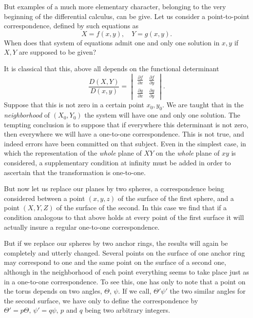 \documentclass[12pt,oneside]{book}
\begin{document}
But examples of a much more elementary character, belonging to the very
beginning of the differential calculus, can be give. Let us consider a
point-to-point correspondence, defined by such equations as
$$X=f(x,y),\quad Y=g(x,y).$$
When does that system of equations admit one and only one solution in $x,y$ if
$X, Y$ are supposed to be given? \par

It is classical that this, above all depends on the functional determinant
$$\frac{D(X,Y)}{D(x,y)}=
    \begin{vmatrix}
        \frac{\partial f}{\partial x} & \frac{\partial f}{\partial y} \\[0.3em]
        \frac{\partial g}{\partial x} & \frac{\partial g}{\partial y}
    \end{vmatrix}. $$
Suppose that this is not zero in a certain point $x_0,y_0$. We are taught that
in the \textit{neighborhood} of $(X_0,Y_0)$ the system will have one and only
one solution. The tempting conclusion is to suppose that if everywhere this
determinant is not zero, then everywhere we will have a one-to-one
correspondence. This is not true, and indeed errors have been committed on that
subject. Even in the simplest case, in which the representation of the
\textit{whole} plane of $XY$ on the \textit{whole} plane of $xy$ is considered,
a supplementary condition at infinity must be added in order to ascertain that
the transformation is one-to-one. \par

But now let us replace our planes by two spheres, a correspondence being
considered between a point $(x,y,z)$ of the surface of the first sphere, and a
point $(X,Y,Z)$ of the surface of the second. In this case we find that if a
condition analogous to that above holds at every point of the first surface it
will actually insure a regular one-to-one correspondence. \par

But if we replace our spheres by two anchor rings, the results will again be
completely and utterly changed. Several points on the surface of one anchor ring
may correspond to one and the same point on the surface of a second one,
although in the neighborhood of each point everything seems to take place just as
in a one-to-one correspondence. To see this, one has only to note that a point
on the torus depends on two angles, $\Theta$, $\psi$. If we call,
$\Theta'\psi'$ the two similar angles for the second surface, we have only to
define the correspondence by $\Theta'=p\Theta,\, \psi'=q\psi,\, p$ and $q$ being
two arbitrary integers.\footnotemark
\end{document}
